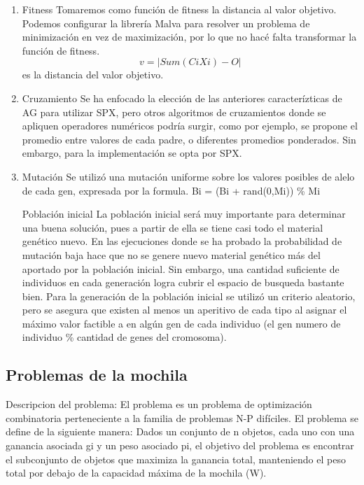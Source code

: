\documentclass[9pt,conference]{IEEEtran}
\begin{document}
\begin{enumerate}
	\item Fitness
		Tomaremos como función de fitness la distancia al valor objetivo.
		Podemos configurar la librería Malva para resolver un problema de minimización en vez de maximización, por lo que no hacé falta transformar la función de fitness.
		\[ v = |Sum(CiXi) - O| \]
		es la distancia del valor objetivo.

	\item Cruzamiento
		Se ha enfocado la elección de las anteriores caracterízticas de AG para utilizar SPX, pero otros algoritmos de cruzamientos donde se apliquen operadores numéricos podría surgir, como por ejemplo, se propone el promedio entre valores de cada padre, o diferentes promedios ponderados. Sin embargo, para la implementación se opta por SPX.

	\item Mutación
		Se utilizó una mutación uniforme sobre los valores posibles de alelo de cada gen, expresada por la formula.
		Bi = (Bi + rand(0,Mi)) \% Mi


	Población inicial
		La población inicial será muy importante para determinar una buena solución, pues a partir de ella se tiene casi todo el material genético nuevo. En las ejecuciones donde se ha probado la probabilidad de mutación baja hace que no se genere nuevo material genético más del aportado por la población inicial. Sin embargo, una cantidad suficiente de individuos en cada generación logra cubrir el espacio de busqueda bastante bien. Para la generación de la población inicial se utilizó un criterio aleatorio, pero se asegura que existen al menos un aperitivo de cada tipo al asignar el máximo valor factible a en algún gen de cada individuo (el gen numero de individuo \% cantidad de genes del cromosoma).
	\end{enumerate}

	\subsection{Problemas de la mochila}


	Descripcion del problema:
	El problema es un problema de optimización combinatoria perteneciente a la familia de problemas N-P difíciles. El problema se define de la siguiente manera:
	Dados un conjunto de n objetos, cada uno con una ganancia asociada gi y un peso asociado pi, el objetivo del problema es encontrar el subconjunto de objetos que maximiza la ganancia total, manteniendo el peso total por debajo de la capacidad máxima de la mochila (W).	
	
\end{document}
